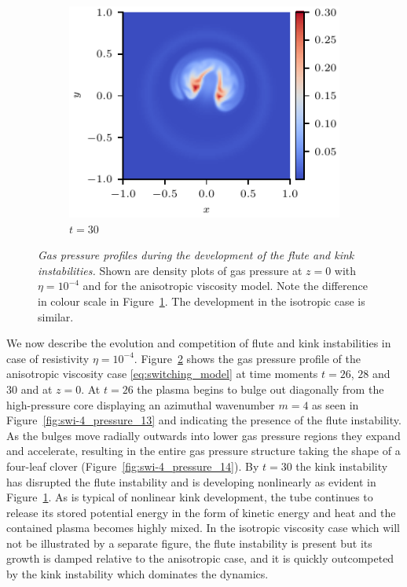 \documentclass[fleqn,usenatbib]{mnras}
\newcommand{\rev}[1]{{\color{red} {#1}}}
\newcommand{\newold}[2]{{#1}{}}
\newcommand{\mycaption}[2]{\caption[#1]{\emph{#1} #2}}
\begin{document}
\begin{figure}
\begin{subfigure}{0.32\textwidth}
      \includegraphics[width=\linewidth]{swi-4_pressure_15.pdf}
      \caption{$t=30$}
      \label{fig:swi-4_pressure_15}
    \end{subfigure}
\mycaption{\rev{Gas pressure} profiles during the development of the flute and kink
instabilities.}{Shown are density plots of \rev{gas} pressure at $z=0$ with $\eta
= 10^{-4}$ and for the anisotropic viscosity model. Note the difference in
colour scale in Figure~\ref{fig:swi-4_pressure_15}. The development in the
isotropic case is similar.}
\label{fig:kink_pressure_slices-4}%
\end{figure}

We now describe the evolution and competition of flute and kink instabilities
in case of resistivity $\eta=10^{-4}$. Figure~\ref{fig:kink_pressure_slices-4}
shows the \rev{gas} pressure profile of the anisotropic viscosity case
\eqref{eq:switching_model} at time moments $t=26$, $28$ and $30$ and at $z=0$.
\rev{At $t= 26$ the plasma begins to bulge out diagonally} from the
high-pressure core displaying an azimuthal wavenumber $m=4$ as seen in
Figure~\ref{fig:swi-4_pressure_13} \rev{and indicating the presence of the
flute instability}. As  the 
bulges move radially outwards into lower \rev{gas} pressure regions they expand and
accelerate, resulting in the entire \rev{gas} pressure structure \rev{\newold{}{appearing}} taking the
shape of a four-leaf clover (Figure~\ref{fig:swi-4_pressure_14}). By $t=30$ the
kink instability has disrupted the flute instability and is developing
nonlinearly as evident in Figure~\ref{fig:swi-4_pressure_15}. As is typical of
nonlinear kink development, the tube continues to release its stored potential
energy in the form of kinetic energy and heat and the contained plasma becomes
highly mixed. In the  isotropic viscosity case which will not be illustrated by
a separate figure, the flute instability is present but \rev{its
 growth is damped relative to the anisotropic case}, and it is quickly
outcompeted by the kink instability which  dominates the dynamics. 
\end{document}
